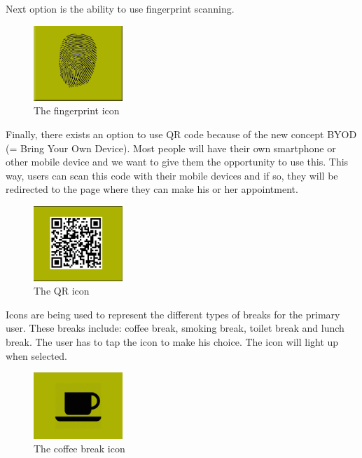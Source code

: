 \documentclass[11pt, a4paper,svglistings]{report}
\begin{document}
Next option is the ability to use fingerprint scanning.

\begin{figure}[H]
\centering
    \includegraphics[width=0.3\textwidth]{Fingerprint.png}
  \caption[Fingerprint icon]{The fingerprint icon}
\end{figure}

Finally, there exists an option to use QR code because of the new concept BYOD (= Bring Your Own Device). Most people will have their own smartphone or other mobile device and we want to give them the opportunity to use this. This way, users can scan this code with their mobile devices and if so, they will be redirected to the page where they can make his or her appointment.

\begin{figure}[H]
\centering
    \includegraphics[width=0.3\textwidth]{Qr.png}
  \caption[QR icon]{The QR icon}
\end{figure}

Icons are being used to represent the different types of breaks for the primary user. These breaks include: coffee break, smoking break, toilet break and lunch break. The user has to tap the icon to make his choice. The icon will light up when selected. 

\begin{figure}[H]
\centering
    \includegraphics[width=0.3\textwidth]{CoffeeBreak.png}
  \caption[Coffee icon]{The coffee break icon}
\end{figure}
\end{document}
